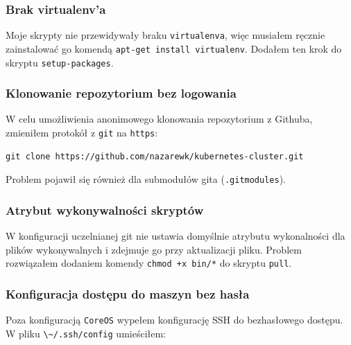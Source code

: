 \documentclass[a4paper,12pt,twoside,openany]{report}
\newcommand{\passthrough}[1]{#1}
\begin{document}
\hypertarget{brak-virtualenva}{%
\subsubsection{Brak virtualenv'a}\label{brak-virtualenva}}

Moje skrypty nie przewidywały braku
\passthrough{\lstinline!virtualenva!}, więc musiałem ręcznie
zainstalować go komendą
\passthrough{\lstinline!apt-get install virtualenv!}. Dodałem ten krok
do skryptu \passthrough{\lstinline!setup-packages!}.

\hypertarget{klonowanie-repozytorium-bez-logowania}{%
\subsubsection{Klonowanie repozytorium bez
logowania}\label{klonowanie-repozytorium-bez-logowania}}

W celu umożliwienia anonimowego klonowania repozytorium z Githuba,
zmieniłem protokół z \passthrough{\lstinline!git!} na
\passthrough{\lstinline!https!}:

\begin{lstlisting}
git clone https://github.com/nazarewk/kubernetes-cluster.git
\end{lstlisting}

Problem pojawił się również dla submodułów gita
(\passthrough{\lstinline!.gitmodules!}).

\hypertarget{atrybut-wykonywalnoux15bci-skryptuxf3w}{%
\subsubsection{Atrybut wykonywalności
skryptów}\label{atrybut-wykonywalnoux15bci-skryptuxf3w}}

W konfiguracji uczelnianej git nie ustawia domyślnie atrybutu
wykonalności dla plików wykonywalnych i zdejmuje go przy aktualizacji
pliku. Problem rozwiązałem dodaniem komendy
\passthrough{\lstinline!chmod +x bin/*!} do skryptu
\passthrough{\lstinline!pull!}.

\hypertarget{konfiguracja-dostux119pu-do-maszyn-bez-hasux142a}{%
\subsubsection{Konfiguracja dostępu do maszyn bez
hasła}\label{konfiguracja-dostux119pu-do-maszyn-bez-hasux142a}}

Poza konfiguracją \passthrough{\lstinline!CoreOS!} wypełem konfigurację
SSH do bezhasłowego dostępu. W pliku
\passthrough{\lstinline!\~/.ssh/config!} umieściłem:
\end{document}
